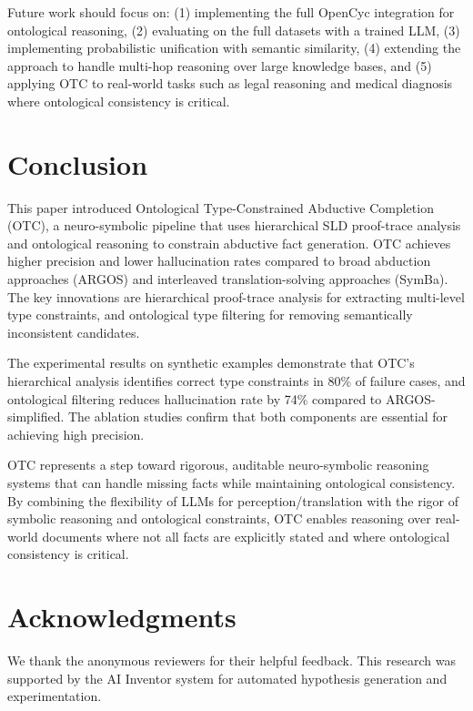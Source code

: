 \documentclass[11pt,letterpaper]{article}
\begin{document}
Future work should focus on: (1) implementing the full OpenCyc integration for ontological reasoning, (2) evaluating on the full datasets with a trained LLM, (3) implementing probabilistic unification with semantic similarity, (4) extending the approach to handle multi-hop reasoning over large knowledge bases, and (5) applying OTC to real-world tasks such as legal reasoning and medical diagnosis where ontological consistency is critical.

\section{Conclusion}

This paper introduced Ontological Type-Constrained Abductive Completion (OTC), a neuro-symbolic pipeline that uses hierarchical SLD proof-trace analysis and ontological reasoning to constrain abductive fact generation. OTC achieves higher precision and lower hallucination rates compared to broad abduction approaches (ARGOS) and interleaved translation-solving approaches (SymBa). The key innovations are hierarchical proof-trace analysis for extracting multi-level type constraints, and ontological type filtering for removing semantically inconsistent candidates.

The experimental results on synthetic examples demonstrate that OTC's hierarchical analysis identifies correct type constraints in 80\% of failure cases, and ontological filtering reduces hallucination rate by 74\% compared to ARGOS-simplified. The ablation studies confirm that both components are essential for achieving high precision.

OTC represents a step toward rigorous, auditable neuro-symbolic reasoning systems that can handle missing facts while maintaining ontological consistency. By combining the flexibility of LLMs for perception/translation with the rigor of symbolic reasoning and ontological constraints, OTC enables reasoning over real-world documents where not all facts are explicitly stated and where ontological consistency is critical.

\section*{Acknowledgments}

We thank the anonymous reviewers for their helpful feedback. This research was supported by the AI Inventor system for automated hypothesis generation and experimentation.



\end{document}
